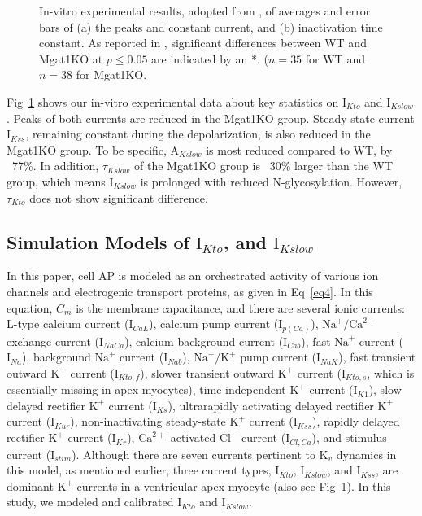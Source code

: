 \documentclass[10pt,letterpaper]{article}
\begin{document}
\begin{figure}[!ht]
    \centering
    \caption{In-vitro experimental results, adopted from \cite{ednie2019reduced}, of averages and error bars of (a) the peaks and constant current, and (b) inactivation time constant. As reported in \cite{ednie2019reduced}, significant differences between WT and Mgat1KO at $p \leq 0.05$ are indicated by an *. ($n=35$ for WT and $n=38$ for Mgat1KO.}
    \label{fig4}
\end{figure}

Fig~\ref{fig4} shows our in-vitro experimental data about key statistics on $\text{I}_{Kto}$ and $\text{I}_{Kslow}$. Peaks of both currents are reduced in the Mgat1KO group. Steady-state current $\text{I}_{Kss}$, remaining constant during the depolarization, is also reduced in the Mgat1KO group. To be specific, $\text{A}_{Kslow}$ is most reduced compared to WT, by ~77\%. In addition, $\tau_{Kslow}$ of the Mgat1KO group is ~30\% larger than the WT group, which means $\text{I}_{Kslow}$ is prolonged with reduced N-glycosylation. However, $\tau_{Kto}$ does not show significant difference.

\subsection*{Simulation Models of $\text{I}_{Kto}$, and $\text{I}_{Kslow}$}
In this paper, cell AP is modeled as an orchestrated activity of various ion channels and electrogenic transport proteins, as given in Eq~\ref{eq4}. In this equation, $C_m$ is the membrane capacitance, and there are several ionic currents: L-type calcium current ($\text{I}_{CaL}$), calcium pump current ($\text{I}_{p(Ca)}$), $\text{Na}^{+}/\text{Ca}^{2+}$ exchange current ($\text{I}_{NaCa}$), calcium background current ($\text{I}_{Cab}$), fast $\text{Na}^{+}$ current ($\text{I}_{Na}$), background $\text{Na}^{+}$ current ($\text{I}_{Nab}$), $\text{Na}^{+}/\text{K}^{+}$ pump current ($\text{I}_{NaK}$), fast transient outward $\text{K}^{+}$ current ($\text{I}_{Kto,f}$), slower transient outward $\text{K}^{+}$ current ($\text{I}_{Kto,s}$, which is essentially missing in apex myocytes), time independent $\text{K}^{+}$ current ($\text{I}_{K1}$), slow delayed rectifier $\text{K}^{+}$ current ($\text{I}_{Ks}$), ultrarapidly activating delayed rectifier $\text{K}^{+}$ current ($\text{I}_{Kur}$), non-inactivating steady-state $\text{K}^{+}$ current ($\text{I}_{Kss}$), rapidly delayed rectifier $\text{K}^{+}$ current ($\text{I}_{Kr}$), $\text{Ca}^{2+}$-activated $\text{Cl}^{-}$ current ($\text{I}_{Cl,Ca}$), and stimulus current ($\text{I}_{stim}$). Although there are seven currents pertinent to $\text{K}_{v}$ dynamics in this model, as mentioned earlier, three current types, $\text{I}_{Kto}$, $\text{I}_{Kslow}$, and $\text{I}_{Kss}$, are dominant $\text{K}^{+}$ currents in a ventricular apex myocyte \cite{nerbonne2005molecular} (also see Fig~\ref{fig4}). In this study, we modeled and calibrated $\text{I}_{Kto}$ and $\text{I}_{Kslow}$.
\end{document}
